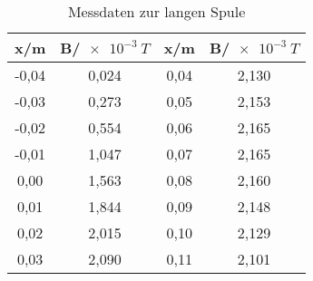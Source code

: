 \begin{table}[h!]
  \centering
  \caption{Messdaten zur langen Spule}
  \label{tab:ls}
  \begin{tabular}{c c c c}
    \toprule
  x/m &	 B/$\SI{e-3}{T}$	  &   x/m &	 B/$\SI{e-3}{T}$	  \\
    \midrule
    -0,04	& 0,024  &  0,04	& 2,130\\
    -0,03	& 0,273  &  0,05	& 2,153\\
    -0,02	& 0,554  &  0,06	& 2,165\\
    -0,01	& 1,047  &  0,07	& 2,165\\
     0,00	& 1,563  &  0,08	& 2,160\\
     0,01	& 1,844  &  0,09	& 2,148\\
     0,02	& 2,015  &  0,10	& 2,129\\
     0,03	& 2,090  &  0,11	& 2,101\\
    \bottomrule
  \end{tabular}
\end{table}
